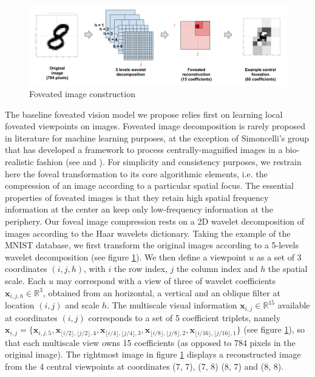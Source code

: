 \documentclass{article} %
\begin{document}
\begin{figure}[t!]
	\centerline{
		\includegraphics[width = \linewidth]{img/ICLR-foveated-model.png} 
	}
	\caption{Foveated image construction}\label{fig:foveated}
\end{figure}

The baseline foveated vision model we propose relies first on learning local foveated viewpoints on images. Foveated image decomposition is rarely proposed in literature for machine learning purposes, at the exception of Simoncelli's group that has developed a framework to process centrally-magnified images in a bio-realistic fashion (see \cite{freeman2011metamers} and \cite{Deza2016piranhas}). For simplicity and consistency purposes, we restrain here the foveal transformation to its core algorithmic elements, i.e. the compression of an image according to a particular spatial focus. The essential properties of foveated images is that they retain high spatial frequency information at the center an keep only low-frequency information at the periphery. Our foveal image compression rests on a 2D wavelet decomposition of images according to the Haar wavelets dictionary. Taking the example of the MNIST database, we first transform the original images according to a 5-levels wavelet decomposition (see figure \ref{fig:foveated}). We then define a viewpoint $u$ as a set of 3 coordinates $(i,j,h)$, with $i$ the row index, $j$ the column index and $h$ the spatial scale. Each $u$ may correspond with a view of three of wavelet coefficients $\boldsymbol{x}_{i,j,h} \in \mathbb{R}^3$, obtained from an horizontal, a vertical and an oblique filter at location $(i,j)$ and scale $h$.  The multiscale visual information $\boldsymbol{x}_{i,j} \in \mathbb{R}^{15}$ available at coordinates $(i,j)$ corresponds to a set of 5 coefficient triplets, namely $\boldsymbol{x}_{i,j}=\{\boldsymbol{x}_{i,j,5}, \boldsymbol{x}_{\lfloor i/2\rfloor,\lfloor j/2\rfloor,4}, \boldsymbol{x}_{\lfloor i/4\rfloor,\lfloor j/4\rfloor,3}, \boldsymbol{x}_{\lfloor i/8\rfloor,\lfloor j/8\rfloor, 2}, \boldsymbol{x}_{\lfloor i/16\rfloor,\lfloor j/16\rfloor, 1}\}$ (see figure \ref{fig:foveated}), so that each multiscale view owns 15 coefficients (as opposed to 784 pixels in the original image).
The rightmost image in figure \ref{fig:foveated} displays a reconstructed image from the 4 central viewpoints at coordinates (7, 7), (7, 8) (8, 7) and (8, 8).
\end{document}
